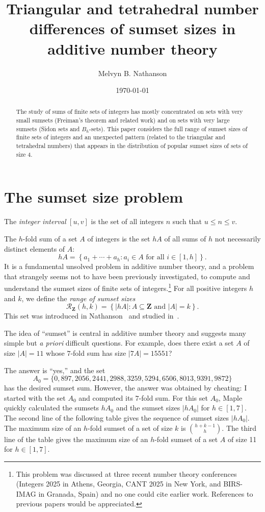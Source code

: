 \documentclass{amsart}
\title[Sumset sizes in additive number theory]
{Triangular and tetrahedral number differences of sumset sizes 
in additive number theory}
\author{Melvyn B.  Nathanson}
\date{\today}
\newcommand{\Z}{\ensuremath{\mathbf Z}}
\newcommand{\mcr}{\ensuremath{ \mathcal R}}
\begin{document}
 
\begin{abstract}
The study of sums of finite sets of integers has mostly concentrated on sets 
with very small sumsets (Freiman's theorem and related work) 
and on sets with very large sumsets (Sidon sets and $B_h$-sets).  
This paper considers the full range of sumset sizes of finite sets 
of integers and an unexpected 
pattern (related to the triangular and tetrahedral numbers) 
that appears in the distribution of 
popular sumset sizes of sets of size 4. 
\end{abstract}


\maketitle



\section{The sumset size problem}

The \emph{integer interval} $[u,v]$ is the set of all integers $n$ 
such that $u \leq n \leq v$. 


The $h$-fold sum of a set $A$ of integers is the set $hA$ of all sums of $h$ 
not necessarily distinct elements of $A$: 
\[
hA = \left\{ a_1+\cdots + a_h: a_i \in A \text{ for all } i \in [1,h] \right\}.
\]
It is a fundamental unsolved problem in additive number theory, and a problem 
that strangely seems not to have been previously investigated, 
to compute and understand the sumset sizes of finite sets 
of integers.\footnote{This 
 problem was discussed at three recent number theory conferences 
  (Integers 2025 in Athens, Georgia, CANT 2025 in New York, and BIRS-IMAG  in Granada, Spain) and no one could cite earlier work.  
  References to previous papers would be appreciated.}
For all positive integers $h$ and $k$, we define 
the \emph{range of sumset sizes}  
\[
\mcr_{\Z}(h,k) = \left\{ |hA|: A \subseteq \Z \text{ and } |A| = k \right\}.
\] 
This set was introduced in Nathanson~\cite{nath25bb} 
and studied in~\cite{nath25aa,nath2505,nath2505b}.  


The idea of ``sumset'' is central in additive number theory 
and suggests many simple but \emph{a priori} difficult questions.  
For example, does there exist a set $A$ of size $|A| = 11$ 
whose $7$-fold sum has size $|7A| = 15551$?

The answer is ``yes,'' and the set 
\[
A_0 = \{ 0,897, 2056,2441,2988,3259,5294,6506,8013,9391,9872\}
\] 
has the desired sumset sum.  However, the answer was obtained by cheating: I started with the set $A_0$ and  computed its $7$-fold sum.  
For this set $A_0$, Maple quickly calculated the sumsets $hA_0$ 
and the  sumset sizes $|hA_0|$ 
for $h \in [1,7]$.  The second line of the following table 
gives the sequence of sumset sizes $|hA_0|$.  
The maximum size of an $h$-fold sumset of a set of size $k$ 
is $\binom{h+k-1}{h}$. 
The third line of the table gives the maximum size of an $h$-fold sumset 
of a set $A$ of size 11 for $h \in [1,7]$. 
\end{document}
